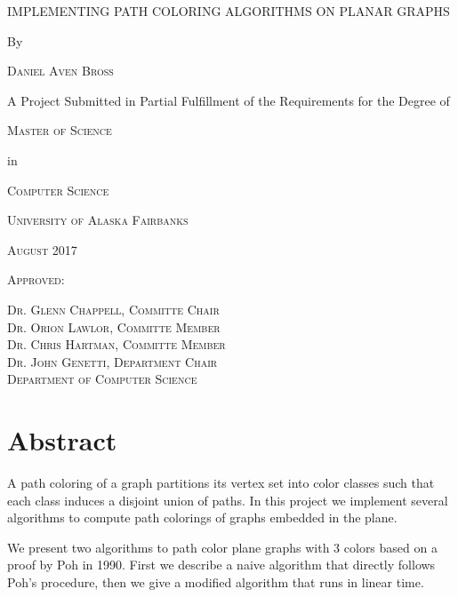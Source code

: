 \documentclass[letterpaper, 12pt]{article}
\theoremstyle{thm}
\begin{document}
\begin{titlepage}
    \centering
    \doublespacing
    {\scshape\Large IMPLEMENTING PATH COLORING ALGORITHMS ON PLANAR GRAPHS \par}
    {By\par}
    {\scshape\large Daniel Aven Bross\par}
    \vspace{2cm}
    {A Project Submitted in Partial Fulfillment of the Requirements for the
        Degree of\par}
    \vspace{2cm}
    {\textsc{Master of Science}\par}
    {in \par}
    {\textsc{Computer Science}\par}
    \vspace{3cm}
    {\textsc{University of Alaska Fairbanks}\par}
    {\textsc{August 2017}\par}
    \vfill
    {\textsc{Approved:}}
    \raggedleft
    \begin{minipage}[t]{.50\textwidth}
        \singlespacing
        \footnotesize\textsc{Dr. Glenn Chappell, Committe Chair}\\
        \footnotesize\textsc{Dr. Orion Lawlor, Committe Member}\\
        \footnotesize\textsc{Dr. Chris Hartman, Committe Member}\\
        \footnotesize\textsc{Dr. John Genetti, Department Chair}\\
        \noindent{\phantom{a}}\hfill\textsc{Department of Computer Science}
    \end{minipage}
\end{titlepage}

\pagebreak

\section*{Abstract}
A path coloring of a graph partitions its vertex set into color classes such
that each class induces a disjoint union of paths. In this project we implement
several algorithms to compute path colorings of graphs embedded in
the plane.

We present two algorithms to path color plane graphs with $3$ colors
based on a proof by Poh in 1990. First we describe a naive algorithm that
directly follows Poh's procedure, then we give a modified algorithm
that runs in linear time.
\end{document}
